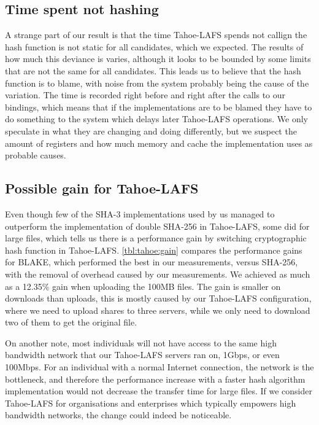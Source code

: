 \documentclass[english,12pt,a4paper]{book}
\begin{document}
\subsection{Time spent not hashing} A strange part of our result is that the
time Tahoe-\ac{LAFS} spends not callign the hash function is not static for all
candidates, which we expected.  The results of how much this deviance is
varies, although it looks to be bounded by some limits that are not the same
for all candidates. This leads us to believe that the hash function is to
blame, with noise from the system probably being the cause of the variation.
The time is recorded right before and right after the calls to our bindings,
which means that if the implementations are to be blamed they have to do
something to the system which delays later Tahoe-{LAFS} operations. We only
speculate in what they are changing and doing differently, but we suspect the
amount of registers and how much memory and cache the implementation uses as
probable causes.

\subsection{Possible gain for Tahoe-LAFS}

Even though few of the \ac{SHA}-3 implementations used by us managed to
outperform the implementation of double \ac{SHA}-256 in Tahoe-\ac{LAFS}, some
did for large files, which tells us there is a performance gain by switching
cryptographic hash function in Tahoe-\ac{LAFS}. \autoref{tbl:tahoe:gain}
compares the performance gains for BLAKE, which performed the best in our
measurements, versus \ac{SHA}-256, with the removal of overhead caused by our
measurements. We achieved as much as a 12.35\% gain when uploading the 100MB
files. The gain is smaller on downloads than uploads, this is
mostly caused by our Tahoe-\ac{LAFS} configuration, where we need to upload
shares to three servers, while we only need to download two of them to get the
original file.



On another note, most individuals will not have access to the same high
bandwidth network that our Tahoe-\ac{LAFS} servers ran on, 1Gbps, or even
100Mbps. For an individual with a normal Internet connection, the network is the
bottleneck, and therefore the performance increase with a faster hash algorithm
implementation would not decrease the transfer time for large files. If we
consider Tahoe-\ac{LAFS} for organisations and enterprises which typically
empowers high bandwidth networks, the change could indeed be noticeable.
\end{document}
